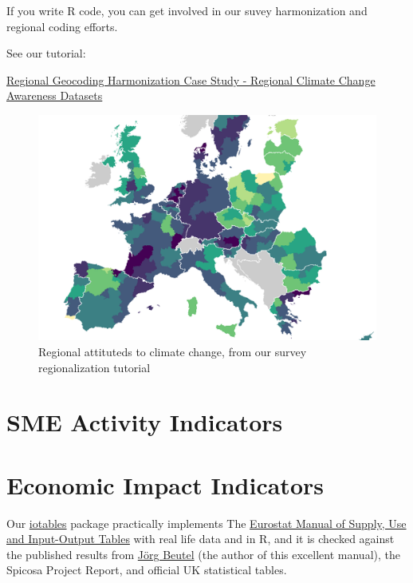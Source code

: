 \documentclass[
  a4paper,
  openany, a4paper, oneside]{book}
\begin{document}
If you write R code, you can get involved in our suvey harmonization and regional coding efforts.

See our tutorial:

\href{http://greendeal.dataobservatory.eu/post/2021-03-06-regions-climate/}{Regional Geocoding Harmonization Case Study - Regional Climate Change Awareness Datasets}

\begin{figure}

{\centering \includegraphics[width=0.67\linewidth]{plots/eurobarometer_climate_attitude_tutorial} 

}

\caption{Regional attituteds to climate change, from our survey regionalization tutorial}\label{fig:regional-climate-attitutes-tutorial-2}
\end{figure}

\hypertarget{sme-indicators}{%
\section{SME Activity Indicators}\label{sme-indicators}}

\hypertarget{economic-impact-indicators}{%
\section{Economic Impact Indicators}\label{economic-impact-indicators}}

Our \href{https://iotables.dataobservatory.eu/}{iotables} package practically implements The \href{https://ec.europa.eu/eurostat/en/web/products-manuals-and-guidelines/-/KS-RA-07-013}{Eurostat Manual of Supply, Use and Input-Output Tables} with real life data and in R, and it is checked against the published results from \href{http://ec.europa.eu/eurostat/documents/3859598/5902113/KS-RA-07-013-EN.PDF/b0b3d71e-3930-4442-94be-70b36cea9b39?version=1.0}{Jörg Beutel} (the author of this excellent manual), the Spicosa Project Report, and official UK statistical tables.
\end{document}
